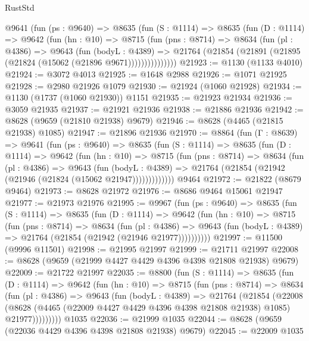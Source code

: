 \begin{lexlean}{RustStd}
\begin{coremodule}
      @9641
        (fun (ps : @9640) =>
        @8635
          (fun (S : @1114) =>
          @8635
            (fun (D : @1114) =>
            @9642
              (fun (hn : @10) =>
              @8715
                (fun (pns : @8714) =>
                @8634
                  (fun (pl : @4386) =>
                  @9643
                    (fun (bodyL : @4389) =>
                    @21764 (@21854 (@21891 (@21895 (@21824 (@15062 (@21896 @9671)))))))))))))))
@21923 := @1130 (@1133 @4010)
@21924 := @3072 @4013
@21925 := @1648 @2988
@21926 := @1071 @21925
@21928 := @2980 @21926 @1079
@21930 := @21924 (@1060 @21928)
@21934 := @1130 (@1737 (@1060 @21930)) @1151
@21935 := @21923 @21934
@21936 := @3059 @21935
@21937 := @21921 @21936
@21938 := @21886 @21936
@21942 := @8628 (@9659 (@21810 @21938) @9679)
@21946 := @8628 (@4465 (@21815 @21938) @1085)
@21947 := @21896 @21936
@21970 := @8864
    (fun (Γ : @8639) =>
    @9641
      (fun (ps : @9640) =>
      @8635
        (fun (S : @1114) =>
        @8635
          (fun (D : @1114) =>
          @9642
            (fun (hn : @10) =>
            @8715
              (fun (pns : @8714) =>
              @8634
                (fun (pl : @4386) =>
                @9643
                  (fun (bodyL : @4389) =>
                  @21764 (@21854 (@21942 (@21946 (@21824 (@15062 @21947)))))))))))))
    @9464
@21972 := @21822 (@8679 @9464)
@21973 := @8628 @21972
@21976 := @8686 @9464 @15061 @21947
@21977 := @21973 @21976
@21995 := @9967
    (fun (ps : @9640) =>
    @8635
      (fun (S : @1114) =>
      @8635
        (fun (D : @1114) =>
        @9642
          (fun (hn : @10) =>
          @8715
            (fun (pns : @8714) =>
            @8634
              (fun (pl : @4386) =>
              @9643 (fun (bodyL : @4389) => @21764 (@21854 (@21942 (@21946 @21977))))))))))
@21997 := @11500 (@9996 @11501)
@21998 := @21995 @21997
@21999 := @21711 @21997
@22008 := @8628 (@9659 (@21999 @4427 @4429 @4396 @4398 @21808 @21938) @9679)
@22009 := @21722 @21997
@22035 := @8800
    (fun (S : @1114) =>
    @8635
      (fun (D : @1114) =>
      @9642
        (fun (hn : @10) =>
        @8715
          (fun (pns : @8714) =>
          @8634
            (fun (pl : @4386) =>
            @9643
              (fun (bodyL : @4389) =>
              @21764
                (@21854
                  (@22008
                    (@8628
                      (@4465 (@22009 @4427 @4429 @4396 @4398 @21808 @21938) @1085)
                      @21977)))))))))
    @1035
@22036 := @21999 @1035
@22044 := @8628 (@9659 (@22036 @4429 @4396 @4398 @21808 @21938) @9679)
@22045 := @22009 @1035

\end{coremodule}
\end{lexlean}
